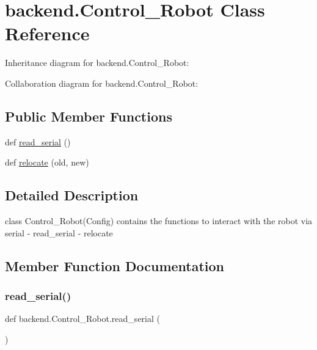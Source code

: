 \hypertarget{classbackend_1_1Control__Robot}{}\section{backend.\+Control\+\_\+\+Robot Class Reference}
\label{classbackend_1_1Control__Robot}


Inheritance diagram for backend.\+Control\+\_\+\+Robot\+:


Collaboration diagram for backend.\+Control\+\_\+\+Robot\+:
\subsection*{Public Member Functions}
\begin{DoxyCompactItemize}
\item 
def \hyperlink{classbackend_1_1Control__Robot_a2963285d136120e08cbca12fff41c3e4_a2963285d136120e08cbca12fff41c3e4}{read\+\_\+serial} ()
\item 
def \hyperlink{classbackend_1_1Control__Robot_a7ea7aa2bb9ce9a16bf6f4ccb42dca12d_a7ea7aa2bb9ce9a16bf6f4ccb42dca12d}{relocate} (old, new)
\end{DoxyCompactItemize}


\subsection{Detailed Description}
\begin{DoxyVerb}class Control_Robot(Config) contains the functions to interact with the robot via serial
    - read_serial
    - relocate
\end{DoxyVerb}
 

\subsection{Member Function Documentation}
\mbox{\label{classbackend_1_1Control__Robot_a2963285d136120e08cbca12fff41c3e4_a2963285d136120e08cbca12fff41c3e4}} 
\subsubsection{\texorpdfstring{read\+\_\+serial()}{read\_serial()}}
{\footnotesize\ttfamily def backend.\+Control\+\_\+\+Robot.\+read\+\_\+serial (\begin{DoxyParamCaption}{ }\end{DoxyParamCaption})}


